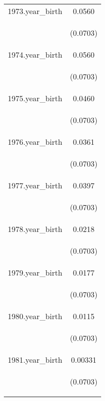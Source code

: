 \documentclass[]{article}
\begin{document}
\begin{center}
\begin{tabular}{lc}
1973.year\_birth & 0.0560 \\
\vspace{4pt} & \begin{footnotesize}(0.0703)\end{footnotesize} \\
1974.year\_birth & 0.0560 \\
\vspace{4pt} & \begin{footnotesize}(0.0703)\end{footnotesize} \\
1975.year\_birth & 0.0460 \\
\vspace{4pt} & \begin{footnotesize}(0.0703)\end{footnotesize} \\
1976.year\_birth & 0.0361 \\
\vspace{4pt} & \begin{footnotesize}(0.0703)\end{footnotesize} \\
1977.year\_birth & 0.0397 \\
\vspace{4pt} & \begin{footnotesize}(0.0703)\end{footnotesize} \\
1978.year\_birth & 0.0218 \\
\vspace{4pt} & \begin{footnotesize}(0.0703)\end{footnotesize} \\
1979.year\_birth & 0.0177 \\
\vspace{4pt} & \begin{footnotesize}(0.0703)\end{footnotesize} \\
1980.year\_birth & 0.0115 \\
\vspace{4pt} & \begin{footnotesize}(0.0703)\end{footnotesize} \\
1981.year\_birth & 0.00331 \\
\vspace{4pt} & \begin{footnotesize}(0.0703)\end{footnotesize} \\

\end{tabular}
\end{center}
\end{document}
